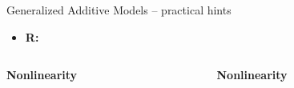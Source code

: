 
\begin{frame}{Generalized Additive Models -- practical hints}


\begin{itemize}
  \item \textbf{R:}
\end{itemize}

\medskip
\begin{columns}[onlytextwidth]
  \begin{column}{0.5\textwidth}

    \begin{itemize}
      \positem \textbf{Nonlinearity}
    \end{itemize}
  \end{column}

  \begin{column}{0.5\textwidth}

    \begin{itemize}
      \negitem \textbf{Nonlinearity}
    \end{itemize}
  \end{column}
\end{columns}

\end{frame}
